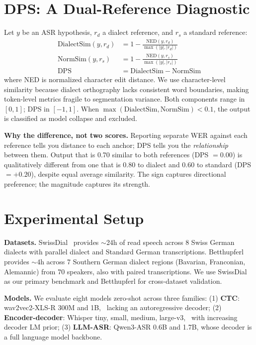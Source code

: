 \documentclass[11pt,a4paper]{article}
\begin{document}
\section{DPS: A Dual-Reference Diagnostic}

Let $y$ be an ASR hypothesis, $r_d$ a dialect reference, and $r_s$ a standard reference:
\begin{align}
\text{DialectSim}(y, r_d) &= 1 - \frac{\text{NED}(y, r_d)}{\max(|y|, |r_d|)} \label{eq:ds} \\
\text{NormSim}(y, r_s) &= 1 - \frac{\text{NED}(y, r_s)}{\max(|y|, |r_s|)} \label{eq:ns} \\
\text{DPS} &= \text{DialectSim} - \text{NormSim} \label{eq:dps}
\end{align}
where NED is normalized character edit distance. We use character-level similarity because dialect orthography lacks consistent word boundaries, making token-level metrics fragile to segmentation variance. Both components range in $[0,1]$; DPS in $[-1, 1]$. When $\max(\text{DialectSim}, \text{NormSim}) < 0.1$, the output is classified as model collapse and excluded.

\textbf{Why the difference, not two scores.} Reporting separate WER against each reference tells you distance to each anchor; DPS tells you the \textit{relationship} between them. Output that is 0.70 similar to both references (DPS $= 0.00$) is qualitatively different from one that is 0.80 to dialect and 0.60 to standard (DPS $= +0.20$), despite equal average similarity. The sign captures directional preference; the magnitude captures its strength.

\section{Experimental Setup}

\textbf{Datasets.} SwissDial~ provides $\sim$24h of read speech across 8 Swiss German dialects with parallel dialect and Standard German transcriptions. Betthupferl~ provides $\sim$4h across 7 Southern German dialect regions (Bavarian, Franconian, Alemannic) from 70 speakers, also with paired transcriptions. We use SwissDial as our primary benchmark and Betthupferl for cross-dataset validation.

\textbf{Models.} We evaluate eight models zero-shot across three families: (1) \textbf{CTC}: wav2vec2-XLS-R 300M and 1B,~ lacking an autoregressive decoder; (2) \textbf{Encoder-decoder}: Whisper tiny, small, medium, large-v3,~ with increasing decoder LM prior; (3) \textbf{LLM-ASR}: Qwen3-ASR 0.6B and 1.7B, whose decoder is a full language model backbone.
\end{document}
